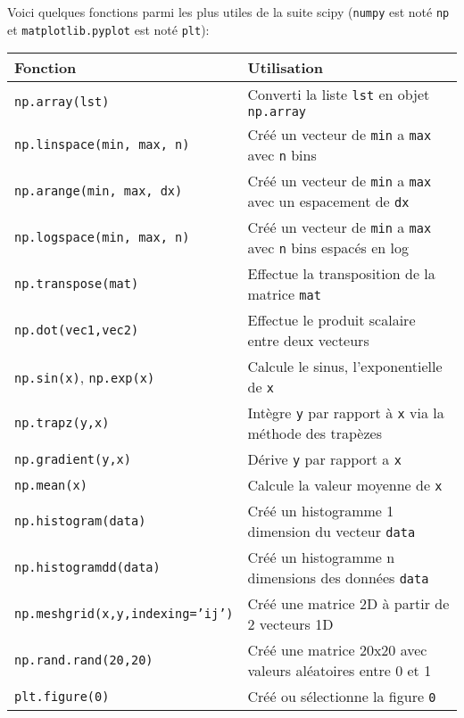 \documentclass{article}
\begin{document}
Voici quelques fonctions parmi les plus utiles de la suite scipy (\texttt{numpy} est noté \texttt{np} et \texttt{matplotlib.pyplot} est noté \texttt{plt}):

\begin{tabular}{|l|l|}
    \hline
    Fonction                                    & Utilisation\\
    \hline
    \texttt{np.array(lst)}                      & Converti la liste \texttt{lst} en objet \texttt{np.array}\\
    \texttt{np.linspace(min, max, n)}           & Créé un vecteur de \texttt{min} a \texttt{max} avec \texttt{n} bins\\
    \texttt{np.arange(min, max, dx)}            & Créé un vecteur de \texttt{min} a \texttt{max} avec un espacement de \texttt{dx}\\
    \texttt{np.logspace(min, max, n)}           & Créé un vecteur de \texttt{min} a \texttt{max} avec \texttt{n} bins espacés en log\\
    \texttt{np.transpose(mat)}                  & Effectue la transposition de la matrice \texttt{mat}\\
    \texttt{np.dot(vec1,vec2)}                  & Effectue le produit scalaire entre deux vecteurs\\
    \texttt{np.sin(x)}, \texttt{np.exp(x)}      & Calcule le sinus, l'exponentielle de \texttt{x}\\
    \texttt{np.trapz(y,x)}                      & Intègre \texttt{y} par rapport à \texttt{x} via la méthode des trapèzes\\
    \texttt{np.gradient(y,x)}                   & Dérive \texttt{y} par rapport a \texttt{x}\\
    \texttt{np.mean(x)}                         & Calcule la valeur moyenne de \texttt{x}\\
    \texttt{np.histogram(data)}                 & Créé un histogramme 1 dimension du vecteur \texttt{data}\\
    \texttt{np.histogramdd(data)}               & Créé un histogramme n dimensions des données \texttt{data}\\
    \texttt{np.meshgrid(x,y,indexing='ij')}     & Créé une matrice 2D à partir de 2 vecteurs 1D\\
    \texttt{np.rand.rand(20,20)}                & Créé une matrice 20x20 avec valeurs aléatoires entre 0 et 1\\
    \texttt{plt.figure(0)}                      & Créé ou sélectionne la figure \texttt{0}\\

\end{tabular}
\end{document}

